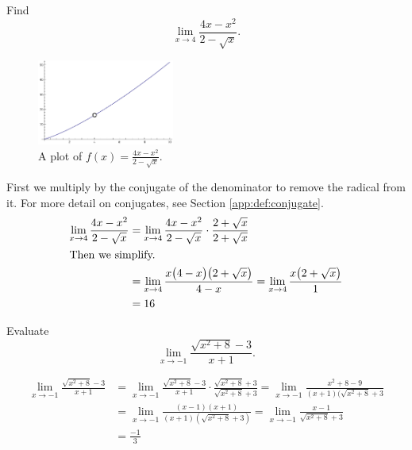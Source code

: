 \begin{ex}
  Find
  \[ \lim_{x \to 4} \frac{4x-x^2}{2-\sqrt x} \text{.} \]
  \begin{sol}
    \begin{figure}[h]
      \begin{center}
        \includegraphics[width=0.4\textwidth]{continuous/limits/4xmx2}
      \end{center}
      \caption{A plot of $f(x)=\frac{4x-x^2}{2-\sqrt x}$.}
    \end{figure}
    First we multiply by the conjugate of the denominator to remove the radical from it. For more detail on conjugates, see Section \ref{app:def:conjugate}.
    \begin{align*}
      \lim_{x \to 4} \frac{4x-x^2}{2-\sqrt x}
      &= \lim_{x \to 4} \frac{4x-x^2}{2-\sqrt x} \cdot \frac{2+\sqrt x}{2+\sqrt x}\\
      \intertext{Then we simplify.}
      &=\lim_{x \to 4} \frac{x\big(4-x\big)\big(2+\sqrt{x}\big)}{4-x}
       = \lim_{x \to 4} \frac{x\big(2+\sqrt{x}\big)}{1} \\
      &= 16
    \end{align*}
  \end{sol}
\end{ex}
\begin{ex}
  Evaluate
  \[ \lim_{x \to -1} \frac{\sqrt{x^2+8}-3}{x+1} \text{.} \]
  \begin{sol}
    \begin{align*}
      \lim_{x \to -1} \frac{\sqrt{x^2+8}-3}{x+1}
      &= \lim_{x \to -1} \frac{\sqrt{x^2+8}-3}{x+1} \cdot \frac{\sqrt{x^2+8}+3}{\sqrt{x^2+8}+3}
      = \lim_{x \to -1} \frac{x^2+8-9}{(x+1)(\sqrt{x^2+8}+3} \\
      &= \lim_{x \to -1} \frac{(x-1)(x+1)}{(x+1)(\sqrt{x^2+8}+3)}
      = \lim_{x \to -1} \frac{x-1}{\sqrt{x^2+8}+3} \\
      &= \frac{-1}{3}
    \end{align*}
  \end{sol}
\end{ex}
